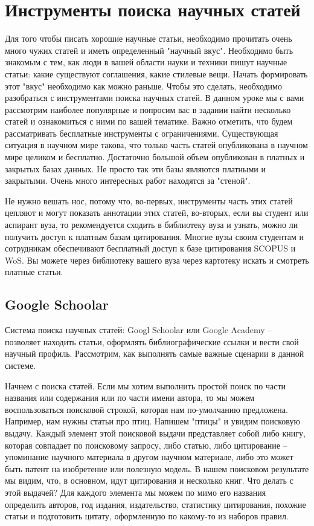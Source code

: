 \documentclass{report}
\begin{document}
\section{Инструменты поиска научных статей}
Для того чтобы писать хорошие научные статьи, необходимо прочитать очень много чужих статей и иметь  определенный "научный вкус". Необходимо быть знакомым с тем, как люди в вашей области науки и техники пишут научные статьи: какие существуют соглашения, какие стилевые вещи. Начать формировать этот "вкус" необходимо как можно раньше. Чтобы это сделать, необходимо разобраться с инструментами поиска научных статей. В данном уроке мы с вами рассмотрим наиболее популярные и попросим вас в задании найти несколько статей и ознакомиться с ними по вашей тематике. Важно отметить, что будем рассматривать бесплатные инструменты с ограничениями. Существующая ситуация в научном мире такова, что только часть статей опубликована в научном мире целиком и бесплатно. Достаточно большой объем опубликован в платных и закрытых базах данных. Не просто так эти базы являются платными и закрытыми. Очень много интересных работ находятся за "стеной". 

Не нужно вешать нос, потому что, во-первых, инструменты часть этих статей цепляют и могут показать аннотации этих статей, во-вторых, если вы студент или аспирант вуза, то рекомендуется сходить в библиотеку вуза и узнать, можно ли получить доступ к платным базам цитирования. Многие вузы своим студентам и сотрудникам обеспечивают бесплатный доступ к базе цитирования SCOPUS и WoS. Вы можете через библиотеку вашего вуза через картотеку искать и смотреть платные статьи.

\subsection{Google Schoolar}
Система поиска научных статей: Googl Schoolar или Google Academy -- позволяет находить статьи, оформлять библиографические ссылки и вести свой научный профиль. Рассмотрим, как выполнять самые важные сценарии в данной системе. 

Начнем с поиска статей. Если мы хотим выполнить простой поиск по части названия или содержания или по части имени автора, то мы можем воспользоваться поисковой строкой, которая нам по-умолчанию предложена. Например, нам нужны статьи про птиц. Напишем "птицы" и увидим поисковую выдачу. Каждый элемент этой поисковой выдачи представляет собой либо книгу, которая совпадает по поисковому запросу, либо статью, либо цитирование -- упоминание научного материала в другом научном материале, либо это может быть патент  на изобретение или полезную модель. В нашем поисковом результате мы видим, что, в основном, идут цитирования и несколько книг. Что делать с этой выдачей? Для каждого элемента мы можем по мимо его названия определить авторов, год издания, издательство, статистику цитирования, похожие статьи и подготовить цитату, оформленную по какому-то из наборов правил. 
\end{document}
